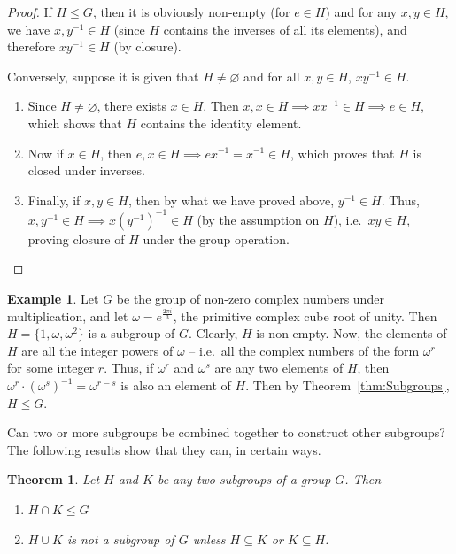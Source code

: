 \documentclass[svgnames]{article}
\newtheorem{Theorem}{Theorem}[section]
\theoremstyle{definition}
\newtheorem{Example}[Example]{Example}
\theoremstyle{remark}
\begin{document}
\begin{proof}
If $H \le G$, then it is obviously non-empty (for $e \in H$) and for any $x, y \in H$, we have $x, y^{-1} \in H$ (since $H$ contains the inverses of all its elements), and therefore $xy^{-1} \in H$ (by closure).

Conversely, suppose it is given that $H \ne \varnothing$ and for all $x, y \in H$, $xy^{-1} \in H$.
\begin{enumerate}[label=(\roman*)]
\item Since $H \ne \varnothing$, there exists $x \in H$. Then $x, x \in H \implies xx^{-1} \in H \implies e \in H$, which shows that $H$ contains the identity element.
\item Now if $x \in H$, then $e, x \in H \implies ex^{-1} = x^{-1} \in H$, which proves that $H$ is closed under inverses.
\item Finally, if $x, y \in H$, then by what we have proved above, $y^{-1} \in H$. Thus, $x, y^{-1} \in H \implies x(y^{-1})^{-1} \in H$ (by the assumption on $H$), i.e.\ $xy \in H$, proving closure of $H$ under the group operation.
\end{enumerate}
\end{proof}

\begin{Example}
Let $G$ be the group of non-zero complex numbers under multiplication, and let $\omega = e^{\frac{2\pi i}{3}}$, the primitive complex cube root of unity. Then $H = \{1, \omega, \omega^2\}$ is a subgroup of $G$. Clearly, $H$ is non-empty. Now, the elements of $H$ are all the integer powers of $\omega$ -- i.e.\ all the complex numbers of the form $\omega^r$ for some integer $r$. Thus, if $\omega^r$ and $\omega^s$ are any two elements of $H$, then $\omega^r \cdot (\omega^s)^{-1}  = \omega^{r - s}$ is also an element of $H$. Then by Theorem~\ref{thm:Subgroups}, $H \le G$.
\end{Example}

Can two or more subgroups be combined together to construct other subgroups? The following results show that they can, in certain ways.

\begin{Theorem}\label{thm:SubgroupsIntUni}
Let $H$ and $K$ be any two subgroups of a group $G$. Then
\begin{enumerate}
\item $H \cap K \le G$
\item $H \cup K$ is not a subgroup of $G$ unless $H \subseteq K$ or $K \subseteq H$.
\end{enumerate}
\end{Theorem}
\end{document}
